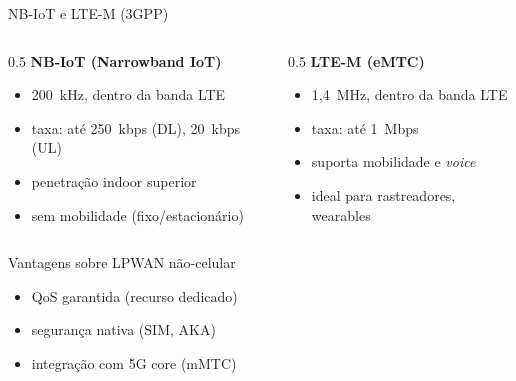 \documentclass[aspectratio=169,11pt]{beamer}
\begin{document}
\begin{frame}{NB-IoT e LTE-M (3GPP)}
  \begin{columns}
    \begin{column}{0.5\textwidth}
      \textbf{NB-IoT (Narrowband IoT)}
      \begin{itemize}
        \item 200~kHz, dentro da banda LTE
        \item taxa: até 250~kbps (DL), 20~kbps (UL)
        \item penetração indoor superior
        \item sem mobilidade (fixo/estacionário)
      \end{itemize}
    \end{column}
    \begin{column}{0.5\textwidth}
      \textbf{LTE-M (eMTC)}
      \begin{itemize}
        \item 1,4~MHz, dentro da banda LTE
        \item taxa: até 1~Mbps
        \item suporta mobilidade e \emph{voice}
        \item ideal para rastreadores, wearables
      \end{itemize}
    \end{column}
  \end{columns}
  \vspace{0.2cm}
  \begin{block}{Vantagens sobre LPWAN não-celular}
    \begin{itemize}
      \item QoS garantida (recurso dedicado)
      \item segurança nativa (SIM, AKA)
      \item integração com 5G core (mMTC)
    \end{itemize}
  \end{block}
\end{frame}
\end{document}
